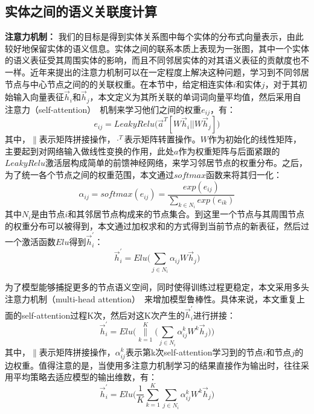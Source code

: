 \subsection{实体之间的语义关联度计算}

\textbf{注意力机制：}
我们的目标是得到实体关系图中每个实体的分布式向量表示，由此较好地保留实体的语义信息。实体之间的联系本质上表现为一张图，其中一个实体的语义表征受其周围实体的影响，而且不同邻居实体的对其语义表征的贡献度也不一样。近年来提出的注意力机制可以在一定程度上解决这种问题，学习到不同邻居节点与中心节点之间的的关联权重。在本节中，给定相连实体$i$和实体$j$，对于其初始输入向量表征$\vec h_i$和$\vec h_j$，本文定义为其所关联的单词词向量平均值，然后采用自注意力（self-attention）~\cite{corr/VaswaniSPUJGKP17, iclr/VelickovicCCRLB18}机制来学习他们之间的权重$e_{ij}$，有：
\begin{equation}
    e_{ij} = LeakyRelu\big(\vec a^T[W\vec h_i || W\vec h_j]\big)
    \label{gat_e_ij}
\end{equation}
\noindent 其中，$\parallel$表示矩阵拼接操作，$\cdot^T$表示矩阵转置操作。$W$作为初始化的线性矩阵，主要起到对网络输入做线性变换的作用，此处$a$作为权重矩阵与后面紧跟的$LeakyRelu$激活层构成简单的前馈神经网络，来学习邻居节点的权重分布。之后，为了统一各个节点之间的权重范围，本文通过$softmax$函数来将其归一化：
\begin{equation}
    \alpha_{ij} = softmax(e_{ij}) = \frac{exp(e_{ij})}{\sum_{k\in N_i}exp(e_{ik})}
    \label{alpha_ij}
\end{equation}
\noindent 其中$N_i$是由节点$i$和其邻居节点构成来的节点集合。到这里一个节点与其周围节点的权重分布可以被得到，本文通过加权求和的方式得到当前节点的新表征，然后过一个激活函数$Elu$得到$\vec h_i^{'}$：
\begin{equation}
    \vec h_i^{'} = Elu\Bigg(\sum_{j \in N_i}{\alpha_{ij} W\vec h_j}\Bigg)
    \label{h_i_t}
\end{equation}

为了模型能够捕捉更多的节点语义空间，同时使得训练过程更稳定，本文采用多头注意力机制（multi-head attention）~\cite{corr/VaswaniSPUJGKP17}来增加模型鲁棒性。具体来说，本文重复上面的self-attention过程K次，然后对这K次产生的$\vec h_i^{'}$进行拼接：
\begin{equation}
    \vec h_i^{'} = Elu\Bigg(\mathop{\parallel}\limits_{k=1}^{K} \Bigg(\sum_{j \in N_i}{\alpha_{ij}^{k} W^k\vec h_j}\Bigg)\Bigg)
    \label{k_heads_1}
\end{equation}
\noindent 其中，$\parallel$表示矩阵拼接操作，$\alpha_{ij}^{k}$表示第k次self-attention学习到的节点$i$和节点$j$的边权重。值得注意的是，当使用多注意力机制学习的结果直接作为输出时，往往采用平均策略去适应模型的输出维数，有：
\begin{equation}
    \vec h_i^{'} = Elu\Bigg(\frac{1}{K}\sum_{k=1}^{K}\sum_{j \in N_i}{\alpha_{ij}^{k} W^k\vec h_j}\Bigg)
    \label{k_heads_2}
\end{equation}


